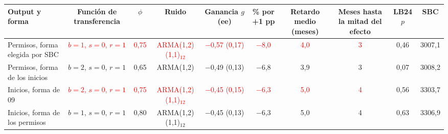 \begin{tabular}{lccccccccc}
\toprule
Output y forma & Funci\'on de transferencia & $\phi$ & Ruido & Ganancia $g$ (ee) & \% por +1 pp & Retardo medio (meses) & Meses hasta la mitad del efecto & LB24 $p$ & SBC
\\ \midrule
Permisos, forma elegida por SBC & \textcolor{red}{$b=1$, $s=0$, $r=1$} & \textcolor{red}{0{,}75} & \textcolor{red}{ARMA(1,2)(1,1)\ensuremath{_{12}}} & \textcolor{red}{\ensuremath{-}0{,}57 (0{,}17)} & \textcolor{red}{\ensuremath{-}8{,}0} & \textcolor{red}{4{,}0} & \textcolor{red}{3} & 0{,}46 & 3007{,}1 \\
Permisos, forma de los inicios & $b=2$, $s=0$, $r=1$ & 0{,}65 & ARMA(1,2) & \ensuremath{-}0{,}49 (0{,}13) & \ensuremath{-}6{,}8 & 3{,}9 & 3 & 0{,}07 & 3008{,}2 \\
Inicios, forma de 09 & \textcolor{red}{$b=2$, $s=0$, $r=1$} & \textcolor{red}{0{,}75} & \textcolor{red}{ARMA(1,2)(1,1)\ensuremath{_{12}}} & \textcolor{red}{\ensuremath{-}0{,}45 (0{,}15)} & \textcolor{red}{\ensuremath{-}6{,}3} & \textcolor{red}{5{,}0} & \textcolor{red}{4} & 0{,}56 & 3303{,}7 \\
Inicios, forma de los permisos & $b=1$, $s=0$, $r=1$ & 0{,}80 & ARMA(1,2)(1,1)\ensuremath{_{12}} & \ensuremath{-}0{,}45 (0{,}13) & \ensuremath{-}6{,}3 & 5{,}0 & 4 & 0{,}63 & 3306{,}9 \\
\bottomrule
\end{tabular}
